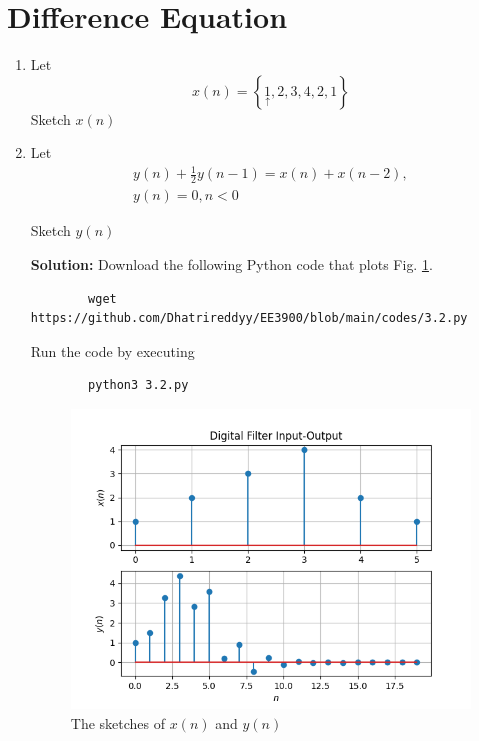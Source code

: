 \documentclass[journal,12pt,twocolumn]{IEEEtran}
\newcommand{\solution}{\noindent \textbf{Solution: }}
\providecommand{\cbrak}[1]{\ensuremath{\left\{#1\right\}}}
\numberwithin{equation}{section}
\renewcommand\thesection{\arabic{section}}
\begin{document}
	\section{Difference Equation}
	\begin{enumerate}[label=\thesection.\arabic*,ref=\thesection.\theenumi]
	\item Let
	\begin{equation}
		x(n) = \cbrak{\underset{\uparrow}{1},2,3,4,2,1}
	\end{equation}
	Sketch $x(n)$
	\item Let
	\begin{multline}
		\label{eq:iir_filter}
		y(n) + \frac{1}{2}y(n-1) = x(n) + x(n-2), \\
 		y(n) = 0, n < 0
	\end{multline}
	
	Sketch $y(n)$

	\solution Download the following Python code that plots Fig. \ref{fig-3}.
	\begin{lstlisting}
		wget https://github.com/Dhatrireddyy/EE3900/blob/main/codes/3.2.py
	\end{lstlisting}
	
	Run the code by executing
	\begin{lstlisting}
		python3 3.2.py
	\end{lstlisting}

	\begin{figure}[!ht]
		\centering
		\includegraphics[width=\columnwidth]{figs/3.png}
		\caption{The sketches of $x(n)$ and $y(n)$}
		\label{fig-3}	
	\end{figure}
	\end{enumerate}
	
\end{document}
